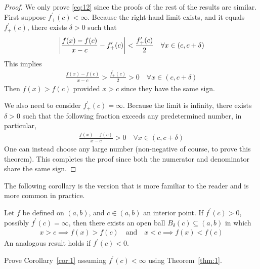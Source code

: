 \documentclass[thmcnt=section, 12pt]{my-elegantbook}
\begin{document}
\begin{proof}
    We only prove \eqref{eq:12} since the proofs of the rest of the results are similar. First suppose $f^\prime_{+}(c) < \infty$. Because the right-hand limit exists, and it equals $f^\prime_{+}(c)$, there exists $\delta > 0$ such that
    \begin{align*}
        \left\lvert 
            \frac{f(x) - f(c)}{x - c}
            - f^\prime_{+}(c)
         \right\rvert < \frac{f^\prime_{+}(c)}{2}
        \quad \forall x \in (c, c+\delta)
    \end{align*}
    This implies
    \begin{align*}
        \frac{f(x) - f(c)}{x - c} > \frac{f^\prime_{+}(c)}{2} > 0
        \quad \forall x \in (c, c+\delta)
    \end{align*}
    Then $f(x) > f(c)$ provided $x > c$ since they have the same sign.

    We also need to consider $f^\prime_{+}(c) = \infty$. Because the limit is infinity, there exists $\delta > 0$ such that the following fraction exceeds any predetermined number, in particular,
    \begin{align*}
        \frac{f(x) - f(c)}{x - c} > 0
        \quad \forall x \in (c, c+\delta)
    \end{align*}
    One can instead choose any large number (non-negative of course, to prove this theorem). This completes the proof since both the numerator and denominator share the same sign.
\end{proof}

\par The following corollary is the version that is more familiar to the reader and is more common in practice.

\begin{corollary} \label{cor:1}
    Let $f$ be defined on $(a, b)$, and $c \in (a, b)$ an interior point. If $f^\prime(c) > 0$, possibly $f^\prime(c) = \infty$, then there exists an open ball $B_\delta(c) \subseteq (a, b)$ in which
    \begin{align}
        x > c \implies f(x) > f(c)
        \quad \text{and} \quad
        x < c \implies f(x) < f(c)
        \label{eq:14}
    \end{align}
    An analogous result holds if $f^\prime(c) < 0$.
\end{corollary}

\begin{exercise}
    Prove Corollary~\ref{cor:1} assuming $f^\prime(c) < \infty$ using Theorem~\ref{thm:1}.
\end{exercise}
\end{document}
